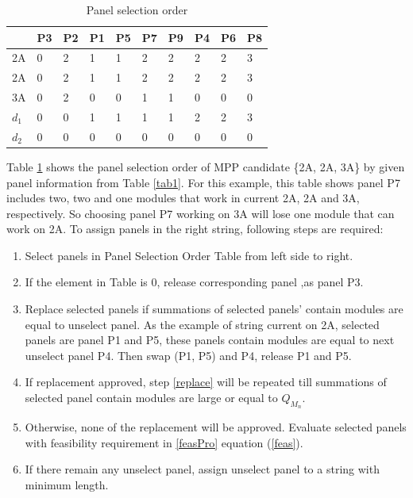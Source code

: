 \documentclass[conference]{IEEEtran}
\begin{document}
\begin{table}[htbp] 
\caption{Panel selection order}
\begin{center}
\begin{tabular}{l|lllllllll}
        & P3 & P2 & P1 & P5 & P7 & P9 & P4 & P6 & P8 \\ \hline 
2A     & 0  & 2  & 1  & 1  & 2  & 2  & 2  & 2  & 3  \\
2A     & 0  & 2  & 1  & 1  & 2  & 2  & 2  & 2  & 3  \\
3A     & 0  & 2  & 0  & 0  & 1  & 1  & 0  & 0  & 0  \\
$d_1$ & 0  & 0  & 1  & 1  & 1  & 1  & 2  & 2  & 3  \\
$d_2$ & 0  & 0  & 0  & 0  & 0  & 0  & 0  & 0  & 0 
\end{tabular}\label{sorted}
\end{center}
\end{table}
Table \ref{sorted} shows the panel selection order of MPP candidate \{2A, 2A, 3A\} by given panel information from Table \ref{tab1}. For this example, this table shows panel P7 includes two, two and one modules that work in current 2A, 2A and 3A, respectively. So choosing panel P7 working on 3A will lose one module that can work on 2A.
To assign panels in the right string, following steps are required:
\begin{enumerate} [1-]
\item Select panels in Panel Selection Order Table from left side to right.
\item If the element in Table is 0, release corresponding panel ,as panel P3.
\item Replace selected panels if summations of selected panels' contain modules are equal to unselect panel. As the example of string current on 2A, selected panels are panel P1 and P5, these panels contain modules are equal to next unselect panel P4. Then swap (P1, P5) and P4, release P1 and P5. \label{replace}
\item If replacement approved, step \ref{replace} will be repeated till summations of selected panel contain modules are large or equal to \textit{$Q_{M_n}$}.
\item Otherwise, none of the replacement will be approved. Evaluate selected panels with feasibility requirement in \ref{feasPro} equation (\ref{feas}).
\item If there remain any unselect panel, assign unselect panel to a string with minimum length. 
\end{enumerate}
\end{document}
